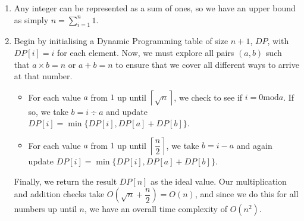 \documentclass{article}
\begin{document}
\begin{solution}
\begin{enumerate}[label = (\alph*)]
    \item Any integer can be represented as a sum of ones, so we have an upper bound as simply $\displaystyle n = \sum_{i = 1}^n 1$.

    \item Begin by initialising a Dynamic Programming table of size $n+1$, $DP$, with $DP[i] = i$ for each element. Now, we must explore all pairs $(a,b)$ such that $a \times b = n$ or $a + b = n$ to ensure that we cover all different ways to arrive at that number.

\begin{itemize}
\item For each value $a$ from $1$ up until $\left \lceil \sqrt{n} \right \rceil$, we check to see if $i = 0 \text{mod} a$. If so, we take $b = i \div a$ and update $DP[i] = \min \{DP[i], DP[a] + DP[b]\}$.
\item For each value $a$ from $1$ up until $\displaystyle \left \lceil \dfrac{n}{2} \right \rceil$, we take $b = i - a$ and again update $DP[i] = \min \{DP[i], DP[a] + DP[b]\}$.
\end{itemize}

Finally, we return the result $DP[n]$ as the ideal value. Our multiplication and addition checks take $\displaystyle O\left (\sqrt{n} + \dfrac{n}{2}\right) = O(n)$, and since we do this for all numbers up until $n$, we have an overall time complexity of $O(n^2)$. 
\end{enumerate}
\end{solution}
\end{document}
